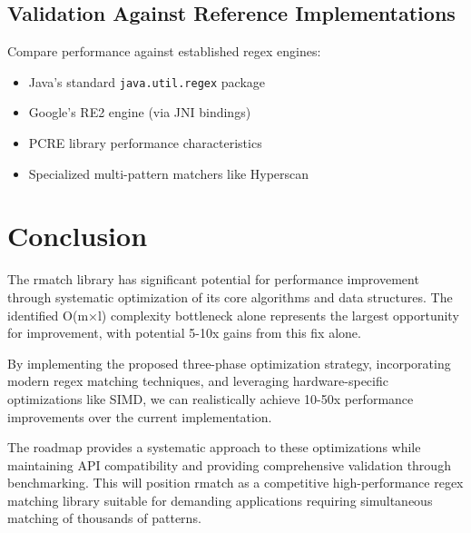 \documentclass[11pt,a4paper]{article}
\begin{document}
\subsection{Validation Against Reference Implementations}

Compare performance against established regex engines:
\begin{itemize}
\item Java's standard \texttt{java.util.regex} package
\item Google's RE2 engine (via JNI bindings)
\item PCRE library performance characteristics
\item Specialized multi-pattern matchers like Hyperscan
\end{itemize}

\section{Conclusion}

The rmatch library has significant potential for performance improvement through systematic optimization of its core algorithms and data structures. The identified O(m×l) complexity bottleneck alone represents the largest opportunity for improvement, with potential 5-10x gains from this fix alone.

By implementing the proposed three-phase optimization strategy, incorporating modern regex matching techniques, and leveraging hardware-specific optimizations like SIMD, we can realistically achieve 10-50x performance improvements over the current implementation.

The roadmap provides a systematic approach to these optimizations while maintaining API compatibility and providing comprehensive validation through benchmarking. This will position rmatch as a competitive high-performance regex matching library suitable for demanding applications requiring simultaneous matching of thousands of patterns.



\end{document}
